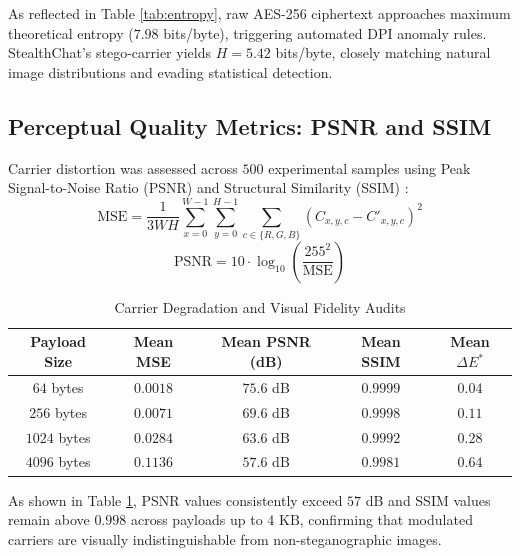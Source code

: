 \documentclass[conference]{IEEEtran}
\begin{document}
As reflected in Table \ref{tab:entropy}, raw AES-256 ciphertext approaches maximum theoretical entropy ($7.98$ bits/byte), triggering automated DPI anomaly rules. StealthChat's stego-carrier yields $H = 5.42$ bits/byte, closely matching natural image distributions and evading statistical detection.

\subsection{Perceptual Quality Metrics: PSNR and SSIM}
Carrier distortion was assessed across $500$ experimental samples using Peak Signal-to-Noise Ratio (PSNR) and Structural Similarity (SSIM) \cite{wang2004image}:
\begin{equation}
    \text{MSE} = \frac{1}{3 W H} \sum_{x=0}^{W-1} \sum_{y=0}^{H-1} \sum_{c \in \{R,G,B\}} \left(C_{x,y,c} - C'_{x,y,c}\right)^2
\end{equation}
\begin{equation}
    \text{PSNR} = 10 \cdot \log_{10}\left(\frac{255^2}{\text{MSE}}\right)
\end{equation}

\begin{table}[htbp]
\caption{Carrier Degradation and Visual Fidelity Audits}
\begin{center}
\begin{tabular}{ccccc}
\toprule
\textbf{Payload Size} & \textbf{Mean MSE} & \textbf{Mean PSNR (dB)} & \textbf{Mean SSIM} & \textbf{Mean $\Delta E^*$} \\
\midrule
$64$ bytes & $0.0018$ & $75.6$ dB & $0.9999$ & $0.04$ \\
$256$ bytes & $0.0071$ & $69.6$ dB & $0.9998$ & $0.11$ \\
$1024$ bytes & $0.0284$ & $63.6$ dB & $0.9992$ & $0.28$ \\
$4096$ bytes & $0.1136$ & $57.6$ dB & $0.9981$ & $0.64$ \\
\bottomrule
\end{tabular}
\label{tab:psnr}
\end{center}
\end{table}

As shown in Table \ref{tab:psnr}, PSNR values consistently exceed $57$ dB and SSIM values remain above $0.998$ across payloads up to $4\text{ KB}$, confirming that modulated carriers are visually indistinguishable from non-steganographic images.
\end{document}
